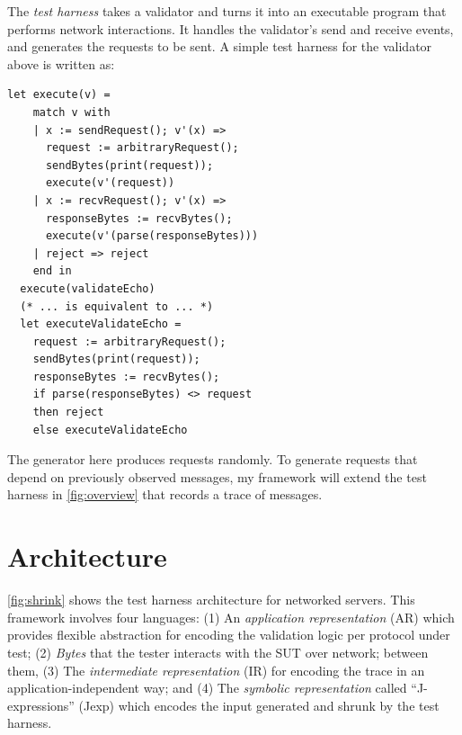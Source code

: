 The {\em test harness} takes a validator and turns it into an executable program
that performs network interactions.  It handles the validator's send and receive
events, and generates the requests to be sent.  A simple test harness for the
validator above is written as:
\begin{lstlisting}[style=customcoq]
  let execute(v) =
    match v with
    | x := sendRequest(); v'(x) =>
      request := arbitraryRequest();
      sendBytes(print(request));
      execute(v'(request))
    | x := recvRequest(); v'(x) =>
      responseBytes := recvBytes();
      execute(v'(parse(responseBytes)))
    | reject => reject
    end in
  execute(validateEcho)
  (* ... is equivalent to ... *)
  let executeValidateEcho =
    request := arbitraryRequest();
    sendBytes(print(request));
    responseBytes := recvBytes();
    if parse(responseBytes) <> request
    then reject
    else executeValidateEcho
\end{lstlisting}

The  generator here produces requests randomly.  To
generate requests that depend on previously observed messages, my framework will
extend the test harness in \autoref{fig:overview} that records a trace of
messages.

\section{Architecture}
\autoref{fig:shrink} shows the test harness architecture for networked
servers.  This framework involves four languages: (1) An {\em
  application representation} (AR) which provides flexible abstraction
for encoding the validation logic per protocol under test; (2) {\em
  Bytes} that the tester interacts with the SUT over network; between
them, (3) The {\em intermediate representation} (IR) for encoding the
trace in an application-independent way; and (4) The {\em symbolic
  representation} called ``J-expressions'' (Jexp) which encodes the
input generated and shrunk by the test harness.

